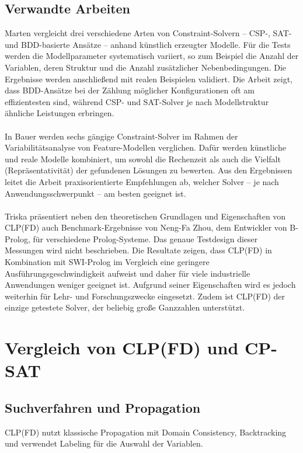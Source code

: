 \documentclass[12pt,a4paper]{article}
\begin{document}
\subsection{Verwandte Arbeiten}
Marten \cite{marten2018} vergleicht drei verschiedene Arten von Constraint-Solvern – CSP-, SAT- und BDD-basierte Ansätze – anhand künstlich erzeugter Modelle.
Für die Tests werden die Modellparameter systematisch variiert, so zum Beispiel die Anzahl der Variablen, deren Struktur und die Anzahl zusätzlicher Nebenbedingungen.
Die Ergebnisse werden anschließend mit realen Beispielen validiert.
Die Arbeit zeigt, dass BDD-Ansätze bei der Zählung möglicher Konfigurationen oft am effizientesten sind, während CSP- und SAT-Solver je nach Modellstruktur ähnliche Leistungen erbringen.\\
\\
In Bauer \cite{bauer2019} werden sechs gängige Constraint-Solver im Rahmen der Variabilitätsanalyse von Feature-Modellen verglichen.
Dafür werden künstliche und reale Modelle kombiniert, um sowohl die Rechenzeit als auch die Vielfalt (Repräsentativität) der gefundenen Lösungen zu bewerten.
Aus den Ergebnissen leitet die Arbeit praxisorientierte Empfehlungen ab, welcher Solver – je nach Anwendungsschwerpunkt – am besten geeignet ist.\\
\\
Triska \cite{drt} präsentiert neben den theoretischen Grundlagen und Eigenschaften von CLP(FD) auch Benchmark-Ergebnisse von Neng-Fa Zhou, dem Entwickler von B-Prolog, für verschiedene Prolog-Systeme.
Das genaue Testdesign dieser Messungen wird nicht beschrieben.
Die Resultate zeigen, dass CLP(FD) in Kombination mit SWI-Prolog im Vergleich eine geringere Ausführungsgeschwindigkeit aufweist und daher für viele industrielle Anwendungen weniger geeignet ist.
Aufgrund seiner Eigenschaften wird es jedoch weiterhin für Lehr- und Forschungszwecke eingesetzt.
Zudem ist CLP(FD) der einzige getestete Solver, der beliebig große Ganzzahlen unterstützt. 
\section{Vergleich von CLP(FD) und CP-SAT}
\subsection{Suchverfahren und Propagation}
\label{sec:search_prop}
CLP(FD) nutzt klassische Propagation mit Domain Consistency, Backtracking und verwendet Labeling für die Auswahl der Variablen.
\end{document}
